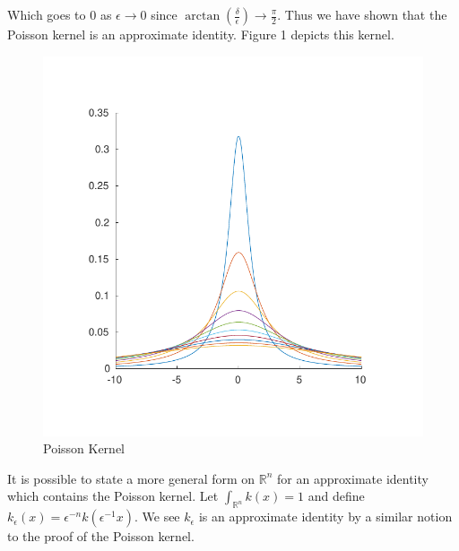 \begin{example}
Which goes to $0$ as $\epsilon \to 0$ since $\arctan(\frac{\delta}{\epsilon}) \to \frac{\pi}{2}$. Thus we have shown that the Poisson kernel is an approximate identity. Figure 1 depicts this kernel.

\begin{figure}[h!bt]
\centering
\includegraphics[scale=0.7]{matlab/poissonkernel}
\caption{Poisson Kernel}
\label{fejer}
\end{figure}

\end{example}

\begin{remark}
It is possible to state a more general form on $\mathbb{R}^n$ for an approximate identity which contains the Poisson kernel. Let $\int_{\mathbb{R}^n} k(x) = 1$ and define $k_\epsilon(x) = \epsilon^{-n}k(\epsilon^{-1}x)$. We see $k_\epsilon$ is an approximate identity by a similar notion to the proof of the Poisson kernel.
\end{remark}


